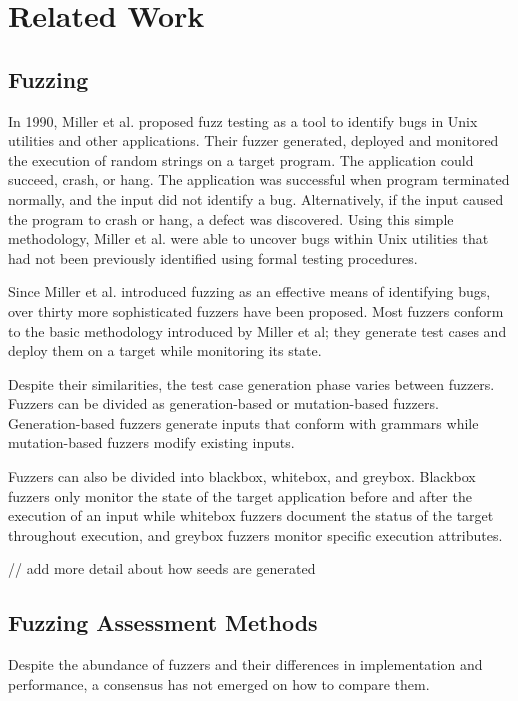 \section{Related Work}

\subsection{Fuzzing}
In 1990, Miller et al. proposed fuzz testing as a tool to identify bugs in Unix utilities and other 
applications. Their fuzzer generated, deployed and monitored the execution of random strings on a 
target program. The application could succeed, crash, or hang. The application was successful when 
program terminated normally, and the input did not identify a bug. Alternatively, if the input caused 
the program to crash or hang, a defect was discovered. Using this simple methodology, Miller et al. 
were able to uncover bugs within Unix utilities that had not been previously identified using formal 
testing procedures. \cite{miller_empirical_1990}

Since Miller et al. introduced fuzzing as an effective means of identifying bugs, over thirty more 
sophisticated fuzzers have been proposed. Most fuzzers conform to the basic methodology introduced by 
Miller et al; they generate test cases and deploy them on a target while monitoring its state. 

Despite their similarities, the test case generation phase varies between fuzzers. Fuzzers can be 
divided as generation-based or mutation-based fuzzers. Generation-based fuzzers generate inputs that 
conform with grammars while mutation-based fuzzers modify existing inputs. 

Fuzzers can also be divided into blackbox, whitebox, and greybox. Blackbox fuzzers only monitor the 
state of the target application before and after the execution of an input while whitebox fuzzers 
document the status of the target throughout execution, and greybox fuzzers monitor specific 
execution attributes. \cite{zhu_fuzzing_2022}

// add more detail about how seeds are generated

\subsection{Fuzzing Assessment Methods}
Despite the abundance of fuzzers and their differences in implementation and performance, a consensus
 has not emerged on how to compare them.

